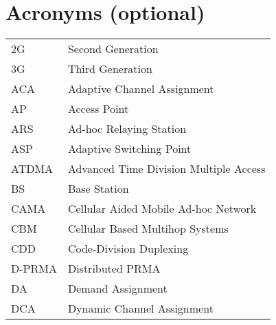 \chapter*{Acronyms (optional)}

\noindent
\begin{tabular}{ll} %
2G & Second Generation \\
3G & Third Generation \\
ACA & Adaptive Channel Assignment \\
AP & Access Point \\
ARS & Ad-hoc Relaying Station \\
ASP & Adaptive Switching Point \\
ATDMA & Advanced Time Division Multiple Access \\
BS & Base Station \\
CAMA & Cellular Aided Mobile Ad-hoc Network \\
CBM & Cellular Based Multihop Systems \\
CDD & Code-Division Duplexing \\
D-PRMA & Distributed PRMA \\
DA & Demand Assignment \\
DCA & Dynamic Channel Assignment \\
\end{tabular}
